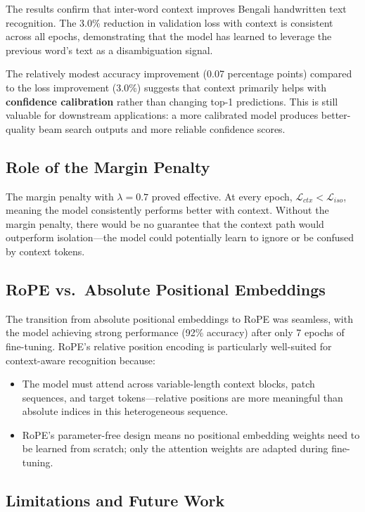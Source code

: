 \documentclass[11pt, a4paper]{article}
\begin{document}
The results confirm that inter-word context improves Bengali handwritten text recognition. The 3.0\% reduction in validation loss with context is consistent across all epochs, demonstrating that the model has learned to leverage the previous word's text as a disambiguation signal.

The relatively modest accuracy improvement (0.07 percentage points) compared to the loss improvement (3.0\%) suggests that context primarily helps with \textbf{confidence calibration} rather than changing top-1 predictions. This is still valuable for downstream applications: a more calibrated model produces better-quality beam search outputs and more reliable confidence scores.

\subsection{Role of the Margin Penalty}

The margin penalty with $\lambda = 0.7$ proved effective. At every epoch, $\mathcal{L}_{ctx} < \mathcal{L}_{iso}$, meaning the model consistently performs better with context. Without the margin penalty, there would be no guarantee that the context path would outperform isolation---the model could potentially learn to ignore or be confused by context tokens.

\subsection{RoPE vs.\ Absolute Positional Embeddings}

The transition from absolute positional embeddings to RoPE was seamless, with the model achieving strong performance (92\% accuracy) after only 7 epochs of fine-tuning. RoPE's relative position encoding is particularly well-suited for context-aware recognition because:

\begin{itemize}
    \item The model must attend across variable-length context blocks, patch sequences, and target tokens---relative positions are more meaningful than absolute indices in this heterogeneous sequence.
    \item RoPE's parameter-free design means no positional embedding weights need to be learned from scratch; only the attention weights are adapted during fine-tuning.
\end{itemize}

\subsection{Limitations and Future Work}
\end{document}
